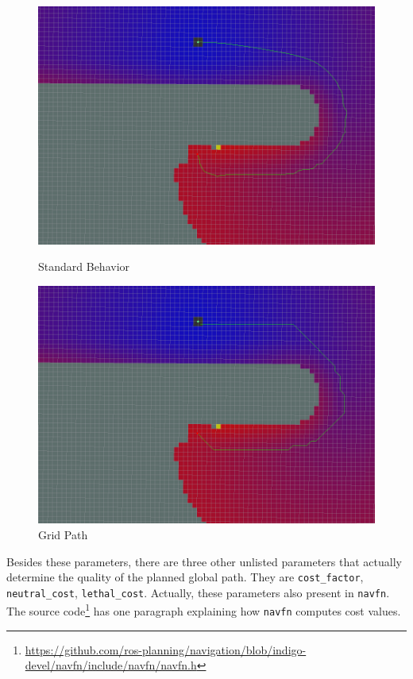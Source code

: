 \documentclass[12pt]{article}
\begin{document}
\begin{figure}[!htb]
  \includegraphics[width=\linewidth]{GlobalPlanner.png}
  \caption{Standard Behavior}
\endminipage\hfill
{}
  \includegraphics[width=\linewidth]{GridPath.png}
  \caption{Grid Path}
\endminipage\hfill
\end{figure}


Besides these parameters, there are three other unlisted parameters that actually determine the quality of the planned
global path. They are \texttt{cost\_factor}, \texttt{neutral\_cost}, \texttt{lethal\_cost}. Actually, these parameters also present
in \texttt{navfn}. The source code\footnote{\scriptsize\url{https://github.com/ros-planning/navigation/blob/indigo-devel/navfn/include/navfn/navfn.h}} \normalsize has one paragraph explaining how \texttt{navfn} computes cost values.
\end{document}
